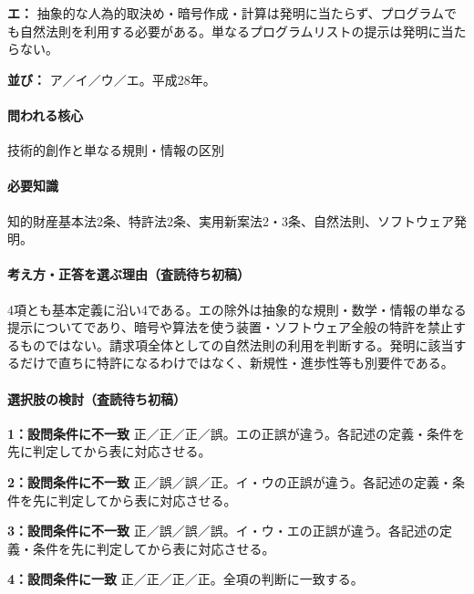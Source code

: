 \noindent\textbf{エ：} 抽象的な人為的取決め・暗号作成・計算は発明に当たらず、プログラムでも自然法則を利用する必要がある。単なるプログラムリストの提示は発明に当たらない。\par

\noindent\textbf{並び：} ア／イ／ウ／エ。平成28年。\par

\paragraph{問われる核心} 技術的創作と単なる規則・情報の区別

\paragraph{必要知識} 知的財産基本法2条、特許法2条、実用新案法2・3条、自然法則、ソフトウェア発明。

\paragraph{考え方・正答を選ぶ理由（査読待ち初稿）} 4項とも基本定義に沿い4である。エの除外は抽象的な規則・数学・情報の単なる提示についてであり、暗号や算法を使う装置・ソフトウェア全般の特許を禁止するものではない。請求項全体としての自然法則の利用を判断する。発明に該当するだけで直ちに特許になるわけではなく、新規性・進歩性等も別要件である。

\paragraph{選択肢の検討（査読待ち初稿）}\mbox{}\par

\noindent\textbf{1：設問条件に不一致} 正／正／正／誤。エの正誤が違う。各記述の定義・条件を先に判定してから表に対応させる。\par

\noindent\textbf{2：設問条件に不一致} 正／誤／誤／正。イ・ウの正誤が違う。各記述の定義・条件を先に判定してから表に対応させる。\par

\noindent\textbf{3：設問条件に不一致} 正／誤／誤／誤。イ・ウ・エの正誤が違う。各記述の定義・条件を先に判定してから表に対応させる。\par

\noindent\textbf{4：設問条件に一致} 正／正／正／正。全項の判断に一致する。\par

